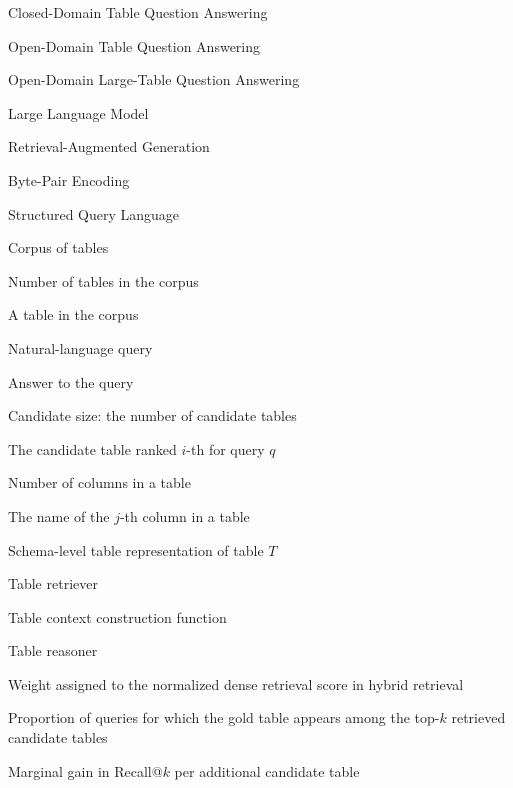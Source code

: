 

\begin{denotation}[3cm]

\item[CTQA]{Closed-Domain Table Question Answering}
\item[OTQA]{Open-Domain Table Question Answering}
\item[OLTQA]{Open-Domain Large-Table Question Answering}
\item[LLM]{Large Language Model}
\item[RAG]{Retrieval-Augmented Generation}
\item[BPE]{Byte-Pair Encoding}
\item[SQL]{Structured Query Language}

\item[$\mathcal{D}$]{Corpus of tables}
\item[$N$]{Number of tables in the corpus}
\item[$T$]{A table in the corpus}
\item[$q$]{Natural-language query}
\item[$a$]{Answer to the query}
\item[$k$]{Candidate size: the number of candidate tables}
\item[$T_i^q$]{The candidate table ranked $i$-th for query $q$}
\item[$m$]{Number of columns in a table}
\item[$c_j$]{The name of the $j$-th column in a table}
\item[$I(T)$]{Schema-level table representation of table $T$}
\item[$R$]{Table retriever}
\item[$C$]{Table context construction function}
\item[$G$]{Table reasoner}
\item[$\alpha$]{Weight assigned to the normalized dense retrieval score in hybrid retrieval}

\item[Recall@$k$]{Proportion of queries for which the gold table appears among the top-$k$ retrieved candidate tables}
\item[MG]{Marginal gain in Recall@$k$ per additional candidate table}

\end{denotation}